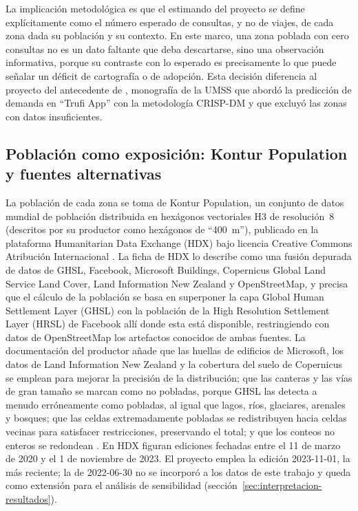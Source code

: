 La implicación metodológica es que el estimando del proyecto se define explícitamente como
el número esperado de consultas, y no de viajes, de cada zona dada su población y su
contexto. En este marco, una zona poblada con cero consultas no es un dato faltante que deba
descartarse, sino una observación informativa, porque su contraste con lo esperado es
precisamente lo que puede señalar un déficit de cartografía o de adopción. Esta decisión
diferencia al proyecto del antecedente de \textcite{angulo2024}, monografía de la UMSS que
abordó la predicción de demanda en ``Trufi App'' con la metodología CRISP-DM y que excluyó las
zonas con datos insuficientes.

\subsection{Población como exposición: Kontur Population y fuentes alternativas}
\label{subsec:kontur}

La población de cada zona se toma de Kontur Population, un conjunto de datos mundial de
población distribuida en hexágonos vectoriales H3 de resolución~8 (descritos por su
productor como hexágonos de \enquote{400~m}), publicado en la plataforma Humanitarian Data
Exchange (HDX) bajo licencia Creative Commons Atribución Internacional
\parencite{kontur2023}. La ficha de HDX lo describe como una fusión depurada de datos de
GHSL, Facebook, Microsoft Buildings, Copernicus Global Land Service Land Cover, Land
Information New Zealand y OpenStreetMap, y precisa que el cálculo de la población se basa en
superponer la capa Global Human Settlement Layer (GHSL) con la población de la High
Resolution Settlement Layer (HRSL) de Facebook allí donde esta está disponible,
restringiendo con datos de OpenStreetMap los artefactos conocidos de ambas fuentes. La
documentación del productor añade que las huellas de edificios de Microsoft, los datos de
Land Information New Zealand y la cobertura del suelo de Copernicus se emplean para mejorar
la precisión de la distribución; que las canteras y las vías de gran tamaño se marcan como
no pobladas, porque GHSL las detecta a menudo erróneamente como pobladas, al igual que
lagos, ríos, glaciares, arenales y bosques; que las celdas extremadamente pobladas se
redistribuyen hacia celdas vecinas para satisfacer restricciones, preservando el total; y
que los conteos no enteros se redondean \parencite{kontur-sf}. En HDX figuran ediciones
fechadas entre el 11 de marzo de 2020 y el 1 de noviembre de 2023. El proyecto emplea la
edición 2023-11-01, la más reciente; la de 2022-06-30 no se incorporó a los datos de este
trabajo y queda como extensión para el análisis de sensibilidad
(sección~\ref{sec:interpretacion-resultados}).

